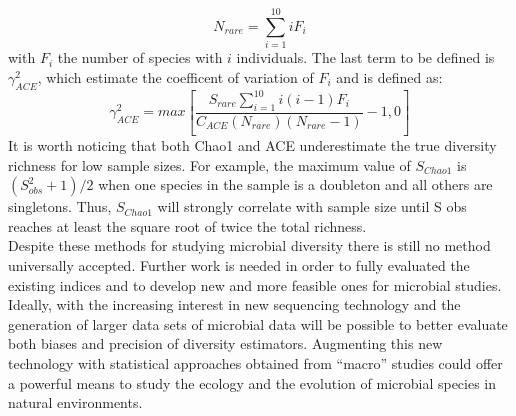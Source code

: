 \begin{equation*}
N_{rare} = \sum_{i=1}^{10} iF_i
\end{equation*}
with $F_i$ the number of species with $i$ individuals. The last term to be defined is $\gamma_{ACE}^2$, which estimate the coefficent of variation of $F_i$ and is defined as:
\begin{equation*}
\gamma_{ACE}^2 = max\left[\frac{S_{rare}\sum_{i=1}^{10} i\left(i-1\right)F_i}{C_{ACE}\left(N_{rare}\right)\left(N_{rare}-1\right)} - 1, 0\right]
\end{equation*}
It is worth noticing that both Chao1 and ACE underestimate the true diversity richness for low sample sizes. For example, the maximum value of $S_{Chao1}$ is $(S_{obs}^2 + 1)/2$ when one species in the sample is a doubleton and all others are singletons. Thus, $S_{Chao1}$ will strongly correlate with sample size until S obs reaches at least the square root of twice the total richness.\\
Despite these methods for studying microbial diversity there is still no method universally accepted. Further work is needed in order to fully evaluated the existing indices and to develop new and more feasible ones for microbial studies. Ideally, with the increasing interest in new sequencing technology and the generation of larger data sets of microbial data will be possible to better evaluate both biases and precision of diversity estimators. Augmenting this new technology  with statistical approaches obtained from ``macro'' studies could offer a powerful means to study the ecology and the evolution of microbial species in natural environments.

